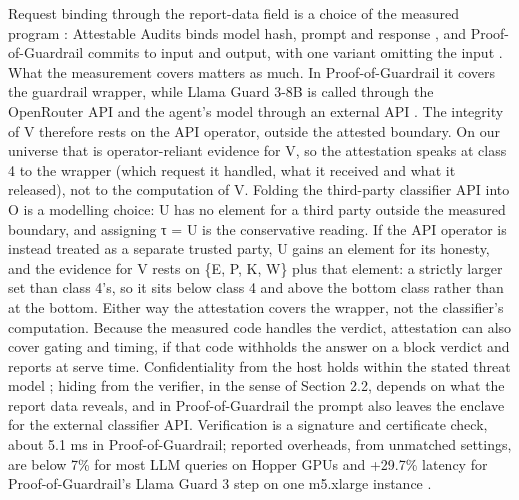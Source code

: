 \documentclass[11pt]{article}
\begin{document}
Request binding through the report-data field is a choice of the measured program \cite{B2}: Attestable Audits binds model hash, prompt and response \cite{B23}, and Proof-of-Guardrail commits to input and output, with one variant omitting the input \cite{B24}. What the measurement covers matters as much. In Proof-of-Guardrail it covers the guardrail wrapper, while Llama Guard 3-8B is called through the OpenRouter API and the agent's model through an external API \cite{B24}. The integrity of V therefore rests on the API operator, outside the attested boundary. On our universe that is operator-reliant evidence for V, so the attestation speaks at class 4 to the wrapper (which request it handled, what it received and what it released), not to the computation of V. Folding the third-party classifier API into O is a modelling choice: U has no element for a third party outside the measured boundary, and assigning τ = U is the conservative reading. If the API operator is instead treated as a separate trusted party, U gains an element for its honesty, and the evidence for V rests on \{E, P, K, W\} plus that element: a strictly larger set than class 4's, so it sits below class 4 and above the bottom class rather than at the bottom. Either way the attestation covers the wrapper, not the classifier's computation. Because the measured code handles the verdict, attestation can also cover gating and timing, if that code withholds the answer on a block verdict and reports at serve time. Confidentiality from the host holds within the stated threat model \cite{B3}; hiding from the verifier, in the sense of Section 2.2, depends on what the report data reveals, and in Proof-of-Guardrail the prompt also leaves the enclave for the external classifier API. Verification is a signature and certificate check, about 5.1 ms in Proof-of-Guardrail; reported overheads, from unmatched settings, are below 7\% for most LLM queries on Hopper GPUs \cite{B8} and +29.7\% latency for Proof-of-Guardrail's Llama Guard 3 step on one m5.xlarge instance \cite{B24}.
\end{document}
